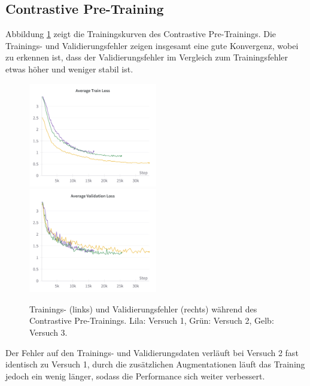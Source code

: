 \subsection{Contrastive Pre-Training} \label{sec:supcon-pre-results}

Abbildung \ref{fig:supcon-pre-loss} zeigt die Trainingskurven des Contrastive Pre-Trainings. Die Trainings- und Validierungsfehler zeigen insgesamt eine gute Konvergenz, wobei zu erkennen ist, dass der Validierungsfehler im Vergleich zum Trainingsfehler etwas höher und weniger stabil ist.

\begin{figure}[h]
	\centering
	\includegraphics[width=0.5\textwidth]{figure_results_supcon-pre_avg-train-loss.png}%
	\includegraphics[width=0.5\textwidth]{figure_results_supcon-pre_avg-val-loss.png}
	\caption[Trainings- (links) und Validierungsfehler (rechts) während des Contrastive Pre-Trainings.]{Trainings- (links) und Validierungsfehler (rechts) während des Contrastive Pre-Trainings. \textcolor{exp1}{Lila}: Versuch 1, \textcolor{exp2}{Grün}: Versuch 2, \textcolor{exp3}{Gelb}: Versuch 3.}
	\label{fig:supcon-pre-loss}
\end{figure}

Der Fehler auf den Trainings- und Validierungsdaten verläuft bei Versuch 2 fast identisch zu Versuch 1, durch die zusätzlichen Augmentationen läuft das Training jedoch ein wenig länger, sodass die Performance sich weiter verbessert.

